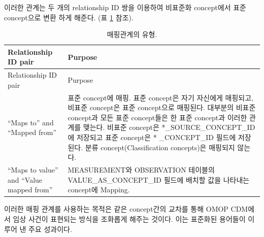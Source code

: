 \documentclass[11pt]{book}
\theoremstyle{definition}
\theoremstyle{definition}
\theoremstyle{definition}
\theoremstyle{remark}
\begin{document}
이러한 관계는 두 개의 relationship ID 쌍을 이용하여 비표준화 concept에서
표준concept으로 변환 하게 해준다. (표 \ref{tab:mappingRelationships}
참조). 

\begin{longtable}[]{@{}ll@{}}
\caption{\label{tab:mappingRelationships} 매핑관계의 유형.}\tabularnewline
\toprule
\begin{minipage}[b]{0.20\columnwidth}\raggedright\strut
Relationship ID pair\strut
\end{minipage} & \begin{minipage}[b]{0.71\columnwidth}\raggedright\strut
Purpose\strut
\end{minipage}\tabularnewline
\midrule
\endfirsthead
\toprule
\begin{minipage}[b]{0.20\columnwidth}\raggedright\strut
Relationship ID pair\strut
\end{minipage} & \begin{minipage}[b]{0.71\columnwidth}\raggedright\strut
Purpose\strut
\end{minipage}\tabularnewline
\midrule
\endhead
\begin{minipage}[t]{0.20\columnwidth}\raggedright\strut
``Maps to'' and ``Mapped from''\strut
\end{minipage} & \begin{minipage}[t]{0.71\columnwidth}\raggedright\strut
표준 concept에 매핑. 표준 concept은 자기 자신에게 매핑되고, 비표준
concept은 표준 concept으로 매핑된다. 대부분의 비표준 concept과 모든 표준
concept들은 한 표준 concept과 이러한 관계를 맺는다. 비표준 concept은
*\_SOURCE\_CONCEPT\_ID에 저장되고 표준 concept은 * \_CONCEPT\_ID 필드에
저장된다. 분류 concept(Classification concepts)은 매핑되지 않는다.\strut
\end{minipage}\tabularnewline
\begin{minipage}[t]{0.20\columnwidth}\raggedright\strut
``Maps to value'' and ``Value mapped from''\strut
\end{minipage} & \begin{minipage}[t]{0.71\columnwidth}\raggedright\strut
MEASUREMENT와 OBSERVATION 테이블의 VALUE\_AS\_CONCEPT\_ID 필드에 배치할
값을 나타내는 concept에 Mapping.\strut
\end{minipage}\tabularnewline
\bottomrule
\end{longtable}

이러한 매핑 관계를 사용하는 목적은 같은 concept간의 교차를 통해 OMOP
CDM에서 임상 사건이 표현되는 방식을 조화롭게 해주는 것이다. 이는
표준화된 용어들이 이루어 낸 주요 성과이다.
\end{document}
